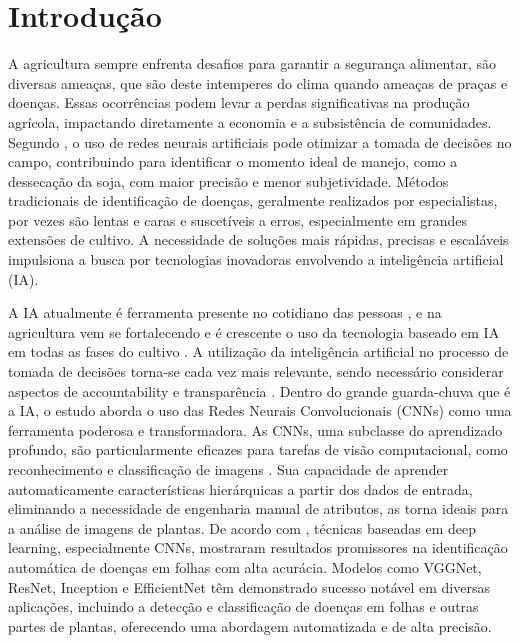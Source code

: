 \documentclass[10pt,conference]{IEEEtran}
\begin{document}
\section{Introdução} 
A agricultura sempre enfrenta desafios para garantir a segurança alimentar, são diversas ameaças, que são deste intemperes do clima quando ameaças de praças e doenças. Essas ocorrências podem levar a perdas significativas na produção agrícola, impactando diretamente a economia e a subsistência de comunidades. Segundo \cite{tessele2024treinamento}, o uso de redes neurais artificiais pode otimizar a tomada de decisões no campo, contribuindo para identificar o momento ideal de manejo, como a dessecação da soja, com maior precisão e menor subjetividade. Métodos tradicionais de identificação de doenças, geralmente realizados por especialistas, por vezes são lentas e caras e suscetíveis a erros, especialmente em grandes extensões de cultivo. A necessidade de soluções mais rápidas, precisas e escaláveis impulsiona a busca por tecnologias inovadoras envolvendo a inteligência artificial (IA).  

A IA atualmente é ferramenta presente no cotidiano das pessoas \cite{garcia2020etica}, e na agricultura vem se fortalecendo e é crescente o uso da tecnologia baseado em IA em todas as fases do cultivo \cite{vicari2021influencias}. A utilização da inteligência artificial no processo de tomada de decisões torna-se cada vez mais relevante, sendo necessário considerar aspectos de accountability e transparência \cite{pinto2020utilizacao}. Dentro do grande guarda-chuva que é a IA, o estudo aborda o uso das Redes Neurais Convolucionais (CNNs) como uma ferramenta poderosa e transformadora. As CNNs, uma subclasse do aprendizado profundo, são particularmente eficazes para tarefas de visão computacional, como reconhecimento e classificação de imagens \cite{simeon2008aplicacao}. Sua capacidade de aprender automaticamente características hierárquicas a partir dos dados de entrada, eliminando a necessidade de engenharia manual de atributos, as torna ideais para a análise de imagens de plantas. De acordo com \cite{mohanty2016deep}, técnicas baseadas em deep learning, especialmente CNNs, mostraram resultados promissores na identificação automática de doenças em folhas com alta acurácia. Modelos como VGGNet, ResNet, Inception e EfficientNet têm demonstrado sucesso notável em diversas aplicações, incluindo a detecção e classificação de doenças em folhas e outras partes de plantas, oferecendo uma abordagem automatizada e de alta precisão.  
\end{document}
